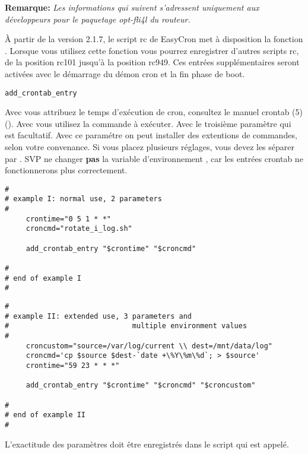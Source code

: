 

\textbf{Remarque:} \emph{Les informations qui suivent s'adressent uniquement aux 
développeurs pour le paquetage opt-fli4l du routeur.}

À partir de la version 2.1.7, le script rc de EasyCron met à disposition
la fonction . Lorsque vous utilisez cette fonction
vous pourrez enregistrer d'autres scripts rc, de la position rc101 jusqu'à
la position rc949. Ces entrées supplémentaires seront activées avec le démarrage
du démon cron et la fin phase de boot.

\texttt{add\_crontab\_entry} 

Avec  vous attribuez le temps d'exécution de cron, consultez le manuel
crontab (5) (). Avec 
vous utilisez la commande à exécuter. Avec le troisième paramètre  qui 
est facultatif. Avec ce paramétre on peut installer des extentions de commandes, 
selon votre convenance. Si vous placez plusieurs réglages, vous devez les séparer 
par \var{$\backslash\backslash$}. SVP ne changer \textbf{pas} la variable 
d'environnement , car les entrées crontab ne fonctionnerons plus 
correctement.

\begin{verbatim}
#
# example I: normal use, 2 parameters
#
     crontime="0 5 1 * *"
     croncmd="rotate_i_log.sh"

     add_crontab_entry "$crontime" "$croncmd"

#
# end of example I
#
\end{verbatim}

\begin{verbatim}
#
# example II: extended use, 3 parameters and 
#                             multiple environment values 
#
     croncustom="source=/var/log/current \\ dest=/mnt/data/log"
     croncmd='cp $source $dest-`date +\%Y\%m\%d`; > $source'
     crontime="59 23 * * *"

     add_crontab_entry "$crontime" "$croncmd" "$croncustom"

#
# end of example II
#
\end{verbatim}

L'exactitude des paramètres doit être enregistrés dans le script qui est appelé.
